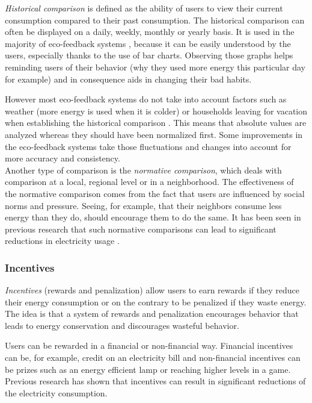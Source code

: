 \documentclass[journal]{vgtc}                %
\begin{document}
\textit{Historical comparison} is defined as the ability of users to view their current consumption compared to their past consumption. %
The historical comparison can often be displayed on a daily, weekly, monthly or yearly basis. It is used in the majority of eco-feedback systems \cite{spagnolli2011eco}, because it can be easily understood by the users, especially thanks to the use of bar charts. %
Observing those graphs helps reminding users of their behavior (why they used more energy this particular day for example) and in consequence aids in changing their bad habits.

However most eco-feedback systems do not take into account factors such as weather (more energy is used when it is colder) or households leaving for vacation when establishing the historical comparison \cite{karjalainen2011consumer}. This means that absolute values are analyzed whereas they should have been normalized first. Some improvements in the eco-feedback systems take those fluctuations and changes into account for more accuracy and consistency. \\

Another type of comparison is the \textit{normative comparison}, which deals with comparison at a local, regional level or in a neighborhood. The effectiveness of the normative comparison comes from the fact that users are influenced by social norms and pressure. Seeing, for example, that their neighbors consume less energy than they do, should encourage them to do the same. It has been seen in previous research that such normative comparisons can lead to significant reductions in electricity usage \cite{peschiera2010response,siero1996changing,iyer2006comparison}.


\subsubsection{Incentives}
\textit{Incentives} (rewards and penalization) allow users to earn rewards if they reduce their energy consumption or on the contrary to be penalized if they waste energy. The idea is that a system of rewards and penalization encourages behavior that leads to energy conservation and discourages wasteful behavior.

Users can be rewarded in a financial or non-financial way. Financial incentives can be, for example, credit on an electricity bill and non-financial incentives can be prizes such as an energy efficient lamp or reaching higher levels in a game.
Previous research \cite{petersen2007dormitory} has shown that incentives can result in significant reductions of the electricity consumption.
\end{document}
